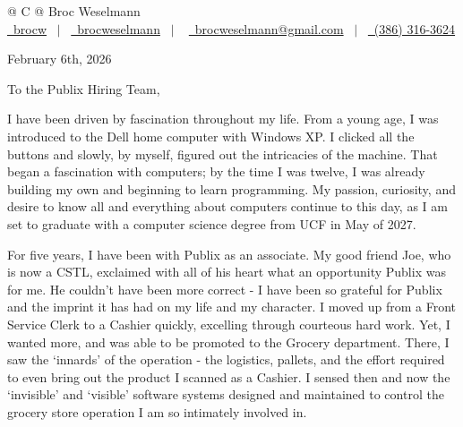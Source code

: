 \documentclass[12pt]{letter}
\begin{document}
\pagestyle{empty} 

\begin{tabularx}{\linewidth}{@{} C @{}}
\Huge{Broc Weselmann} \\[7.5pt]
\href{https://github.com/brocw}{\raisebox{-0.05\height}\faGithub\ brocw} \ $|$ \ 
\href{https://linkedin.com/in/brocweselmann}{\raisebox{-0.05\height}\faLinkedin\ brocweselmann} \ $|$ \ 
\href{mailto:brocweselmann@gmail.com}{\raisebox{-0.05\height}\faEnvelope \ brocweselmann@gmail.com} \ $|$ \ 
\href{tel:+13863163624}{\raisebox{-0.05\height}\faMobile \ (386) 316-3624} \\
\end{tabularx}

\vspace{0.4in}

February 6th, 2026\\

\vspace{0.2in}

To the Publix Hiring Team,\\

\vspace{0.1in}

I have been driven by fascination throughout my life. From a young age, I was introduced to the Dell home computer with Windows XP. I clicked all the buttons and slowly, by myself, figured out the intricacies of the machine. That began a fascination with computers; by the time I was twelve, I was already building my own and beginning to learn programming. My passion, curiosity, and desire to know all and everything about computers continue to this day, as I am set to graduate with a computer science degree from UCF in May of 2027. 

For five years, I have been with Publix as an associate. My good friend Joe, who is now a CSTL, exclaimed with all of his heart what an opportunity Publix was for me. He couldn't have been more correct - I have been so grateful for Publix and the imprint it has had on my life and my character. I moved up from a Front Service Clerk to a Cashier quickly, excelling through courteous hard work. Yet, I wanted more, and was able to be promoted to the Grocery department. There, I saw the `innards' of the operation - the logistics, pallets, and the effort required to even bring out the product I scanned as a Cashier. I sensed then and now the `invisible' and `visible' software systems designed and maintained to control the grocery store operation I am so intimately involved in.
\end{document}
